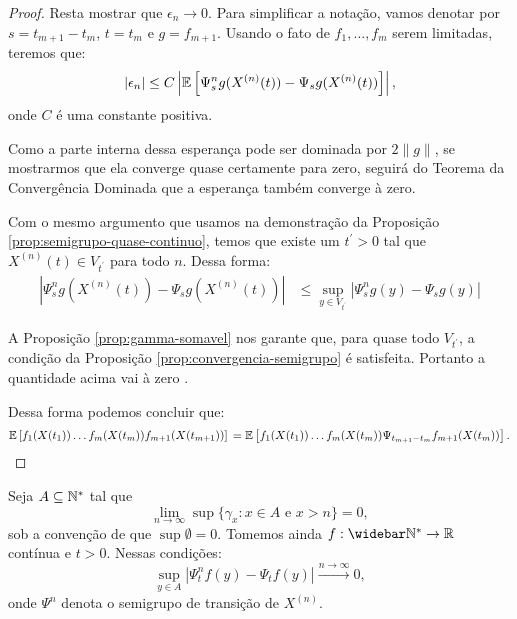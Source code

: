 \begin{proof}
  Resta mostrar que $\epsilon_n \to 0$. Para simplificar a notação,
  vamos denotar por $s = t_{m+1} - t_m$, $t = t_m$ e $g = f_{m+1}$.
  Usando o fato de $f_1, \ldots, f_m$ serem limitadas, teremos que:
  \begin{displaymath}
    |\epsilon_n| \leq  C
    \left\lvert {\mathbb{E}} \left[
        \Psi_{s}^n g (X^{(n)}(t)) -
        \Psi_{s} g (X^{(n)}(t))
      \right]
    \right\rvert,
  \end{displaymath}
  onde $C$ é uma constante positiva.

  Como a parte interna dessa esperança pode ser dominada por $2\lVert
  g \rVert$, se mostrarmos que ela converge quase certamente para
  zero, seguirá do Teorema da Convergência Dominada que a esperança também
  converge à zero.

  Com o mesmo argumento que usamos na demonstração da Proposição
  \ref{prop:semigrupo-quase-continuo}, temos que existe um $t^{\prime}
  > 0$ tal que $X^{(n)}(t) \in V_{t^\prime}$ para todo $n$. Dessa forma:
  \begin{align*}
    \left\lvert \Psi_{s}^n g (X^{(n)}(t)) - \Psi_{s} g (X^{(n)}(t))
    \right\rvert
    &\leq \sup_{y \in V_{t^\prime}}  \left\lvert \Psi_{s}^n g (y) - \Psi_{s} g (y)
    \right\rvert
  \end{align*}

  A Proposição \ref{prop:gamma-somavel} nos garante que, para quase
  todo $V_{t^\prime}$, a condição da Proposição
  \ref{prop:convergencia-semigrupo} é satisfeita. Portanto a
  quantidade acima vai à zero \qc.

  Dessa forma podemos concluir que:
  \begin{displaymath}
    {\mathbb{E}} \left[
      f_{1}(X(t_{1})) 
      \ldots
      f_{m}(X(t_{m})) 
      f_{m+1}(X(t_{m+1})) 
    \right] \notag\\
    = {\mathbb{E}} \left[
      f_{1}(X(t_{1})) 
      \ldots
      f_{m}(X(t_{m})) 
      \Psi_{t_{m+1} - t_{m}} f_{m+1} (X(t_{m})) 
    \right].
    \qedhere
  \end{displaymath}
\end{proof}


\begin{proposicao}
  \label{prop:convergencia-semigrupo}
  Seja $A \subseteq {\mathbb{N^*}}$ tal que
  \begin{displaymath}
    \lim_{n \to \infty} \sup\{ \gamma_x: x \in  A \textrm{ e } x > n\} = 0,
  \end{displaymath}
  sob a convenção de que $\sup \emptyset = 0$. Tomemos ainda $f: \Nzb
  \to \R$ contínua e $t > 0$. Nessas condições:
  \begin{equation}
    \label{eq:convergencia-semigrupo}
    \sup_{y \in A} | \Psi^n_t f (y) - \Psi_t f(y) |
    \xrightarrow{n\to\infty} 0,
  \end{equation}
  onde $\Psi^n$ denota o semigrupo de transição de $X^{(n)}$.
\end{proposicao}

